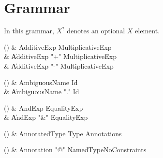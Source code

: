\chapter{Grammar}\label{Grammar}


In this grammar, $X^?$ denotes an optional $X$ element.


\begin{bbgrammarappendix}

() & AdditiveExp \label{prod:AdditiveExp}  \: MultiplicativeExp  \\

 &    \| AdditiveExp \xcd"+" MultiplicativeExp \\
 &    \| AdditiveExp \xcd"-" MultiplicativeExp \\

\end{bbgrammarappendix}

\begin{bbgrammarappendix}

() & AmbiguousName \label{prod:AmbiguousName}  \: Id  \\

 &    \| AmbiguousName \xcd"." Id \\

\end{bbgrammarappendix}

\begin{bbgrammarappendix}

() & AndExp \label{prod:AndExp}  \: EqualityExp  \\

 &    \| AndExp \xcd"&" EqualityExp \\

\end{bbgrammarappendix}

\begin{bbgrammarappendix}

() & AnnotatedType \label{prod:AnnotatedType}  \: Type Annotations  \\


\end{bbgrammarappendix}

\begin{bbgrammarappendix}

() & Annotation \label{prod:Annotation}  \: \xcd"@" NamedTypeNoConstraints  \\


\end{bbgrammarappendix}

